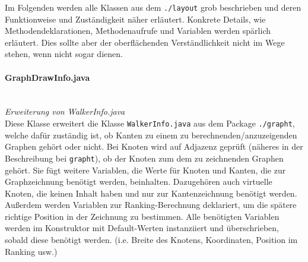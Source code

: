 \documentclass[10pt,a4paper]{article}
\begin{document}
Im Folgenden werden alle Klassen aus dem \texttt{./layout} grob beschrieben und deren Funktionweise und Zuständigkeit näher erläutert. Konkrete Details, wie Methodendeklarationen, Methodenaufrufe und Variablen werden spärlich erläutert. Dies sollte aber der oberflächenden Verständlichkeit nicht im Wege stehen, wenn nicht sogar dienen.

\paragraph{GraphDrawInfo.java}\ \\
\emph{Erweiterung von WalkerInfo.java}\\
{\footnotesize Diese Klasse erweitert die Klasse \texttt{WalkerInfo.java} aus dem Package \texttt{./grapht}, welche dafür zuständig ist, ob Kanten zu einem zu berechnenden/anzuzeigenden Graphen gehört oder nicht. Bei Knoten wird auf Adjazenz geprüft (näheres in der Beschreibung bei \texttt{grapht}), ob der Knoten zum dem zu zeichnenden Graphen gehört. Sie fügt weitere Variablen, die Werte für Knoten und Kanten, die zur Graphzeichnung benötigt werden, beinhalten. Dazugehören auch virtuelle Knoten, die keinen Inhalt haben und nur zur Kantenzeichnung benötigt werden. Außerdem werden Variablen zur Ranking-Berechnung deklariert, um die spätere richtige Position in der Zeichnung zu bestimmen. Alle benötigten Variablen werden im Konstruktor mit Default-Werten instanziiert und überschrieben, sobald diese benötigt werden. (i.e. Breite des Knotens, Koordinaten, Position im Ranking usw.)}
\end{document}
